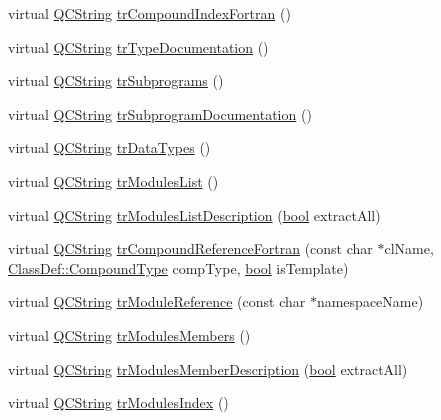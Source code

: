 \begin{DoxyCompactItemize}
virtual \hyperlink{class_q_c_string}{Q\+C\+String} \hyperlink{class_translator_czech_acded3cae09ce0601be33e32a08abab89}{tr\+Compound\+Index\+Fortran} ()
\item 
virtual \hyperlink{class_q_c_string}{Q\+C\+String} \hyperlink{class_translator_czech_ac13a6ba14a9905698227dafadc76636e}{tr\+Type\+Documentation} ()
\item 
virtual \hyperlink{class_q_c_string}{Q\+C\+String} \hyperlink{class_translator_czech_abf847aff2abe1d2197bfa9230ca6a124}{tr\+Subprograms} ()
\item 
virtual \hyperlink{class_q_c_string}{Q\+C\+String} \hyperlink{class_translator_czech_a4c94d14e478f118ff3d46c93d5cbdfe5}{tr\+Subprogram\+Documentation} ()
\item 
virtual \hyperlink{class_q_c_string}{Q\+C\+String} \hyperlink{class_translator_czech_a63842f9d8539583c1e5ed3b1f45ab6b7}{tr\+Data\+Types} ()
\item 
virtual \hyperlink{class_q_c_string}{Q\+C\+String} \hyperlink{class_translator_czech_a9be2c1531d001b7bf2452f4301ad5add}{tr\+Modules\+List} ()
\item 
virtual \hyperlink{class_q_c_string}{Q\+C\+String} \hyperlink{class_translator_czech_ac17790e5e208d3690f2d7229dac54796}{tr\+Modules\+List\+Description} (\hyperlink{qglobal_8h_a1062901a7428fdd9c7f180f5e01ea056}{bool} extract\+All)
\item 
virtual \hyperlink{class_q_c_string}{Q\+C\+String} \hyperlink{class_translator_czech_a0fa9bdec49d36a1ae5396209494740e8}{tr\+Compound\+Reference\+Fortran} (const char $\ast$cl\+Name, \hyperlink{class_class_def_ae70cf86d35fe954a94c566fbcfc87939}{Class\+Def\+::\+Compound\+Type} comp\+Type, \hyperlink{qglobal_8h_a1062901a7428fdd9c7f180f5e01ea056}{bool} is\+Template)
\item 
virtual \hyperlink{class_q_c_string}{Q\+C\+String} \hyperlink{class_translator_czech_a82a5db79fb72c7c2fd866e839df54123}{tr\+Module\+Reference} (const char $\ast$namespace\+Name)
\item 
virtual \hyperlink{class_q_c_string}{Q\+C\+String} \hyperlink{class_translator_czech_a5013233cc16ce172e2196194b1dfb3eb}{tr\+Modules\+Members} ()
\item 
virtual \hyperlink{class_q_c_string}{Q\+C\+String} \hyperlink{class_translator_czech_af11829e16f9321de681d68696a228aae}{tr\+Modules\+Member\+Description} (\hyperlink{qglobal_8h_a1062901a7428fdd9c7f180f5e01ea056}{bool} extract\+All)
\item 
virtual \hyperlink{class_q_c_string}{Q\+C\+String} \hyperlink{class_translator_czech_ae1cbd927b31f6c87ff35f795fab9b2f2}{tr\+Modules\+Index} ()

\end{DoxyCompactItemize}
